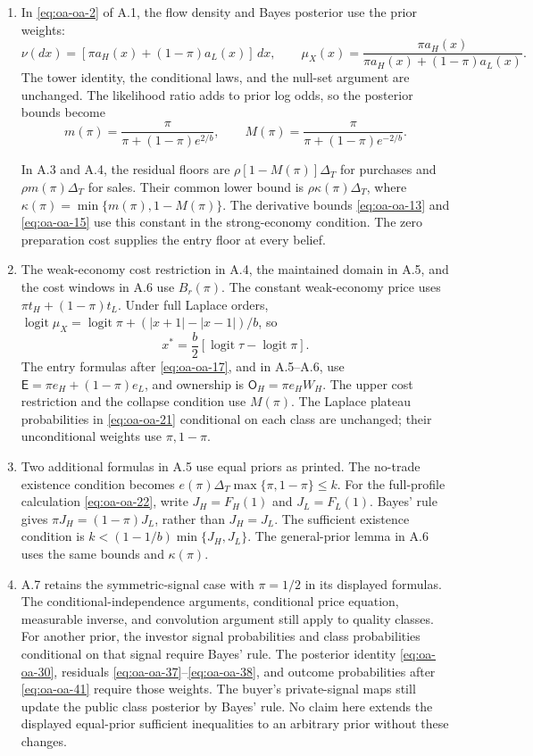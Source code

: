 \begin{enumerate}
\item
In \eqref{eq:oa-oa-2} of A.1, the flow density and Bayes posterior use the prior weights:
\[
\nu(dx)=[\pi a_H(x)+(1-\pi)a_L(x)]\,dx,\qquad
\mu_X(x)=\frac{\pi a_H(x)}{\pi a_H(x)+(1-\pi)a_L(x)}.
\]
The tower identity, the conditional laws, and the null-set argument are unchanged.
The likelihood ratio adds to prior log odds, so the posterior bounds become
\[
m(\pi)=\frac{\pi}{\pi+(1-\pi)e^{2/b}},\qquad
M(\pi)=\frac{\pi}{\pi+(1-\pi)e^{-2/b}}.
\]
\par
In A.3 and A.4, the residual floors are
\(\rho[1-M(\pi)]\Delta_T\) for purchases and
\(\rho m(\pi)\Delta_T\) for sales.
Their common lower bound is
\(\rho\kappa(\pi)\Delta_T\), where
\(\kappa(\pi)=\min\{m(\pi),1-M(\pi)\}\).
The derivative bounds \eqref{eq:oa-oa-13} and \eqref{eq:oa-oa-15} use this constant in the strong-economy condition.
The zero preparation cost supplies the entry floor at every belief.

\item
The weak-economy cost restriction in A.4, the maintained domain in A.5,
and the cost windows in A.6 use \(B_r(\pi)\).
The constant weak-economy price uses \(\pi t_H+(1-\pi)t_L\).
Under full Laplace orders,
\(\operatorname{logit}\mu_X=\operatorname{logit}\pi+(|x+1|-|x-1|)/b\), so
\[
x^*=\frac b2[\operatorname{logit}\tau-\operatorname{logit}\pi].
\]
The entry formulas after \eqref{eq:oa-oa-17}, and in A.5--A.6, use
\(\mathsf E=\pi e_H+(1-\pi)e_L\), and ownership is
\(\mathsf O_H=\pi e_HW_H\).
The upper cost restriction and the collapse condition use \(M(\pi)\).
The Laplace plateau probabilities in \eqref{eq:oa-oa-21} conditional on each class are unchanged;
their unconditional weights use \(\pi,1-\pi\).

\item
Two additional formulas in A.5 use equal priors as printed.
The no-trade existence condition becomes
\(e(\pi)\Delta_T\max\{\pi,1-\pi\}\le k\).
For the full-profile calculation \eqref{eq:oa-oa-22}, write \(J_H=F_H(1)\) and \(J_L=F_L(1)\).
Bayes' rule gives \(\pi J_H=(1-\pi)J_L\), rather than \(J_H=J_L\).
The sufficient existence condition is
\(k<(1-1/b)\min\{J_H,J_L\}\).
The general-prior lemma in A.6 uses the same bounds and \(\kappa(\pi)\).

\item
A.7 retains the symmetric-signal case with \(\pi=1/2\) in its displayed formulas.
The conditional-independence arguments, conditional price equation, measurable inverse, and convolution argument still apply to quality classes.
For another prior, the investor signal probabilities and class probabilities conditional on that signal require Bayes' rule.
The posterior identity \eqref{eq:oa-oa-30}, residuals \eqref{eq:oa-oa-37}--\eqref{eq:oa-oa-38}, and outcome probabilities after \eqref{eq:oa-oa-41} require those weights.
The buyer's private-signal maps still update the public class posterior by Bayes' rule.
No claim here extends the displayed equal-prior sufficient inequalities to an arbitrary prior without these changes.


\end{enumerate}
